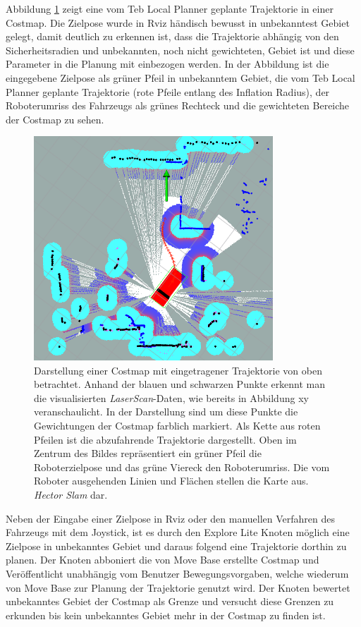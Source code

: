 		    
		    Abbildung \ref{fig: trajektorie} zeigt eine vom Teb Local Planner geplante Trajektorie in einer Costmap. Die Zielpose wurde in Rviz händisch bewusst in unbekanntest Gebiet gelegt, damit deutlich zu erkennen ist, dass die Trajektorie abhängig von den Sicherheitsradien und unbekannten, noch nicht gewichteten, Gebiet ist und diese Parameter in die Planung mit einbezogen werden. In der Abbildung ist die eingegebene Zielpose als grüner Pfeil in unbekanntem Gebiet, die vom Teb Local Planner geplante Trajektorie (rote Pfeile entlang des Inflation Radius), der Roboterumriss des Fahrzeugs als grünes Rechteck und die gewichteten Bereiche der Costmap zu sehen.
		    
		    \begin{figure}[H]
		    	\centering
		    	\includegraphics[width=0.8\textwidth]{Bilder/trajektorie.png}
		    	\caption{Darstellung einer Costmap mit eingetragener Trajektorie von oben betrachtet. Anhand der blauen und schwarzen Punkte erkennt man die visualisierten \textit{LaserScan}-Daten, wie bereits in Abbildung xy veranschaulicht. In der Darstellung sind um diese Punkte die Gewichtungen der Costmap farblich markiert. Als Kette aus roten Pfeilen ist die abzufahrende Trajektorie dargestellt. Oben im Zentrum des Bildes repräsentiert ein grüner Pfeil die Roboterzielpose und das grüne Viereck den Roboterumriss. Die vom Roboter ausgehenden Linien und Flächen stellen die Karte aus. \textit{Hector Slam} dar.}
		    	\label{fig: trajektorie}
		    \end{figure}
	    
	    
	    	Neben der Eingabe einer Zielpose in Rviz oder den manuellen Verfahren des Fahrzeugs mit dem Joystick, ist es durch den Explore Lite Knoten möglich eine Zielpose in unbekanntes Gebiet und daraus folgend eine Trajektorie dorthin zu planen. Der Knoten abboniert die von Move Base erstellte Costmap und Veröffentlicht unabhängig vom Benutzer Bewegungsvorgaben, welche wiederum von Move Base zur Planung der Trajektorie genutzt wird. Der Knoten bewertet unbekanntes Gebiet der Costmap als Grenze und versucht diese Grenzen zu erkunden bis kein unbekanntes Gebiet mehr in der Costmap zu finden ist. \cite{explorelite}
		  

		
			
			
					    
		    
